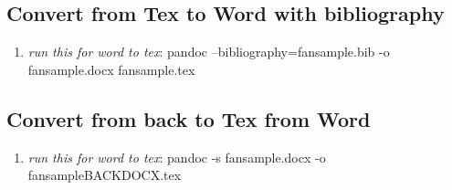 \documentclass[12pt,english]{article}
\begin{document}
\subsection{Convert from Tex to Word with bibliography}

\begin{enumerate}
	\item \textit{run this for word to tex}: pandoc --bibliography=fansample.bib -o fansample.docx fansample.tex
\end{enumerate}

\subsection{Convert from back to Tex from Word}

\begin{enumerate}
	\item \textit{run this for word to tex}: pandoc -s fansample.docx -o fansampleBACKDOCX.tex
\end{enumerate}


\printbibliography
\end{document}
